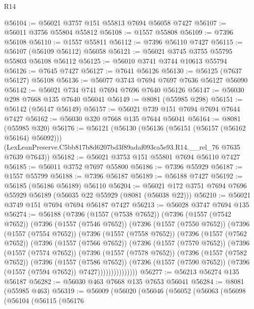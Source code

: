 \begin{lexlean}{R14}
\begin{coremodule}
@56104 := @56021 @3757 @151 @55813 @7694 @56058 @7427
@56107 := @56011 @3756 @55804 @55812
@56108 := @1557 @55808
@56109 := @7396 @56108
@56110 := @1557 @55811
@56112 := @7396 @56110 @7427
@56115 := @56107 (@56109 @56112) @56058
@56121 := @56021 @3745 @3755 @55795 @55803 @56108 @56112
@56125 := @56010 @3741 @3744 @10613 @55794
@56126 := @7645 @7427
@56127 := @7641 @56126
@56130 := @56125 (@7637 @56127) @56108
@56136 := @56077 @3743 @7694 @7697 @7636 @56127 @56090
@56142 := @56021 @734 @741 @7694 @7696 @7640 @56126
@56147 := @56030 @298 @7668 @135 @7640 @56041
@56149 := @8081 (@55985 @298)
@56151 := @56142 (@56147 @56149)
@56157 := @56021 @739 @151 @7694 @7694 @7644 @7427
@56162 := @56030 @320 @7668 @135 @7644 @56041
@56164 := @8081 (@55985 @320)
@56176 := @56121
    (@56130
      (@56136 (@56151 (@56157 (@56162 @56164) @56092)))
      (LexLeanPreserve.C5bb817b8d6207bd3f89adaf093ca5e93.R14.__rel_76 @7635 @7639 @7643))
@56182 := @56021 @3753 @151 @55801 @7694 @56110 @7427
@56185 := @56011 @3752 @7697 @55800
@56186 := @7396 @55929
@56187 := @1557 @55799
@56188 := @7396 @56187
@56189 := @56188 @7427
@56192 := @56185 (@56186 @56189) @56110
@56204 := @56021 @172 @3751 @7694 @7696 @55929 @56189 (@56035 @22 @55929 (@8081 (@56038 @22)))
@56210 := @56021 @3749 @151 @7694 @7694 @56187 @7427
@56213 := @56028 @3747 @7694 @135
@56274 := @56188
    (@7396
      (@1557 (@7538 @7652))
      (@7396
        (@1557 (@7542 @7652))
        (@7396
          (@1557 (@7546 @7652))
          (@7396
            (@1557 (@7550 @7652))
            (@7396
              (@1557 (@7554 @7652))
              (@7396
                (@1557 (@7558 @7652))
                (@7396
                  (@1557 (@7562 @7652))
                  (@7396
                    (@1557 (@7566 @7652))
                    (@7396
                      (@1557 (@7570 @7652))
                      (@7396
                        (@1557 (@7574 @7652))
                        (@7396
                          (@1557 (@7578 @7652))
                          (@7396
                            (@1557 (@7582 @7652))
                            (@7396
                              (@1557 (@7586 @7652))
                              (@7396
                                (@1557 (@7590 @7652))
                                (@7396 (@1557 (@7594 @7652)) @7427)))))))))))))))
@56277 := @56213 @56274 @135 @56187
@56282 := @56030 @463 @7668 @135 @7653 @56041
@56284 := @8081 (@55985 @463)
@56319 := @56009
    (@56020
      (@56046
        (@56052
          (@56063
            (@56098
              (@56104
                (@56115
                  (@56176

\end{coremodule}
\end{lexlean}

